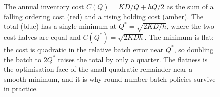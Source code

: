 \begin{figure}[ht]
\begin{tikzpicture}[x=1cm, y=1cm, font=\small]
\end{tikzpicture}
\caption[The economic-order-quantity cost and its flat minimum]{The
annual inventory cost $C(Q) = KD/Q + hQ/2$ as the sum of a falling
ordering cost (red) and a rising holding cost (amber). The total (blue)
has a single minimum at $Q^{*} = \sqrt{2KD/h}$, where the two cost
halves are equal and $C(Q^{*}) = \sqrt{2KDh}$. The minimum is flat:
the cost is quadratic in the relative batch error near $Q^{*}$, so
doubling the batch to $2Q^{*}$ raises the total by only a quarter. The
flatness is the optimisation face of the small quadratic remainder near
a smooth minimum, and it is why round-number batch policies survive in
practice.}
\label{fig:vol02:ch05:eoq-cost}
\end{figure}
